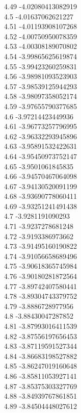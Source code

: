 {4.49	-4.02080413082919\\
4.5	-4.01637062621227\\
4.51	-4.01193908107268\\
4.52	-4.00750950078359\\
4.53	-4.00308189070802\\
4.54	-3.99865625619874\\
4.55	-3.99423260259831\\
4.56	-3.98981093523903\\
4.57	-3.98539125944293\\
4.58	-3.98097358052174\\
4.59	-3.97655790377685\\
4.6	-3.97214423449936\\
4.61	-3.96773257796995\\
4.62	-3.96332293945896\\
4.63	-3.95891532422631\\
4.64	-3.95450973752147\\
4.65	-3.9501061845835\\
4.66	-3.94570467064098\\
4.67	-3.94130520091199\\
4.68	-3.93690778060411\\
4.69	-3.93251241491438\\
4.7	-3.9281191090293\\
4.71	-3.9237278681248\\
4.72	-3.9193386973662\\
4.73	-3.91495160190822\\
4.74	-3.91056658689496\\
4.75	-3.90618365745984\\
4.76	-3.90180281872564\\
4.77	-3.89742407580441\\
4.78	-3.89304743379752\\
4.79	-3.8886728977956\\
4.8	-3.88430047287852\\
4.81	-3.87993016411539\\
4.82	-3.87556197656453\\
4.83	-3.87119591527344\\
4.84	-3.86683198527882\\
4.85	-3.86247019160648\\
4.86	-3.85811053927141\\
4.87	-3.85375303327769\\
4.88	-3.84939767861851\\
4.89	-3.84504448027612\\
}
